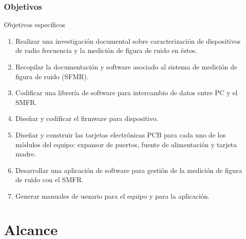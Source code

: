 \documentclass[xcolor=pdftext, table]{beamer}
\begin{document}
	\begin{frame}
		\frametitle{Objetivos}		

		\begin{small}
			\begin{block}{Objetivos específicos}		
				\begin{enumerate}
					\item Realizar una investigación documental sobre caracterización de dispositivos de radio frecuencia y la medición de figura de ruido en éstos.	
											
					\item Recopilar la documentación y software asociado al sistema de medición de figura de ruido (SFMR).	
					
					\item Codificar una librería de software para intercambio de datos entre PC y el SMFR.
					
					\item Diseñar y codificar el firmware para dispositivo.
					
					\item Diseñar y construir las tarjetas electrónicas PCB para cada uno de los módulos del equipo: expansor de puertos, fuente de alimentación y tarjeta madre. 
					
					\item Desarrollar una aplicación de software para gestión de la medición de figura de ruido con el SMFR.
					
					\item Generar manuales de usuario para el equipo y para la aplicación.	
				\end{enumerate}				
			\end{block}
		\end{small}
		
	\end{frame}
	
	\section{Alcance}
	
\end{document}
